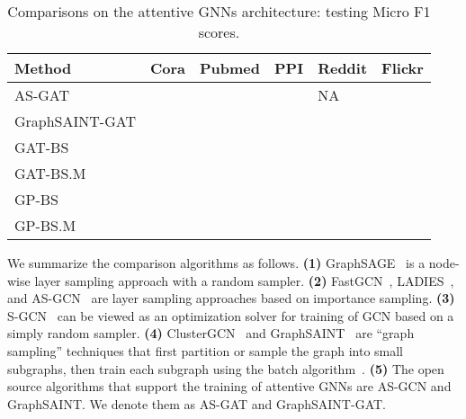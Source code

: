 \documentclass{article}
\begin{document}
{\tiny
\begin{table*}[h]
\caption{Comparisons on the attentive GNNs architecture: testing Micro F1 scores.}
\label{tb:bench-gat}
\begin{center}
\begin{tabular}{llllll}
\toprule
\textbf{Method}  &\textbf{Cora} &\textbf{Pubmed} &\textbf{PPI}& \textbf{Reddit}& \textbf{Flickr} \\
\midrule
AS-GAT &  & &  & NA &  \\
GraphSAINT-GAT &  & &  &  &  \\
\midrule
GAT-BS &  & &  &  &  \\
GAT-BS.M &  & &  &  &  \\
GP-BS &  & &  &  &  \\
GP-BS.M &  & &  &  &  \\
\bottomrule
\end{tabular}
\end{center}
\end{table*}
\vspace{-0.1cm}
}

We summarize the comparison algorithms as follows.
\textbf{(1)} GraphSAGE~\cite{hamilton2017inductive} is
a node-wise layer sampling approach with a random 
sampler.
\textbf{(2)} FastGCN~\cite{chen2018fastgcn}, 
LADIES~\cite{zou2019layer}, and 
AS-GCN~\cite{huang2018adaptive} are
layer sampling approaches based on importance sampling.
\textbf{(3)} S-GCN~\cite{chen2017stochastic} can be 
viewed as an optimization solver for training of 
GCN based on a simply random sampler.
\textbf{(4)} ClusterGCN~\cite{chiang2019cluster} and
GraphSAINT~\cite{zeng2019graphsaint} are 
``graph sampling'' techniques that first partition 
or sample the graph into small subgraphs, then train 
each subgraph using the batch algorithm~\cite{kipf2016semi}.
\textbf{(5)} The open source algorithms that support the training
of attentive GNNs are AS-GCN and GraphSAINT. We denote
them as AS-GAT and GraphSAINT-GAT.
\end{document}
